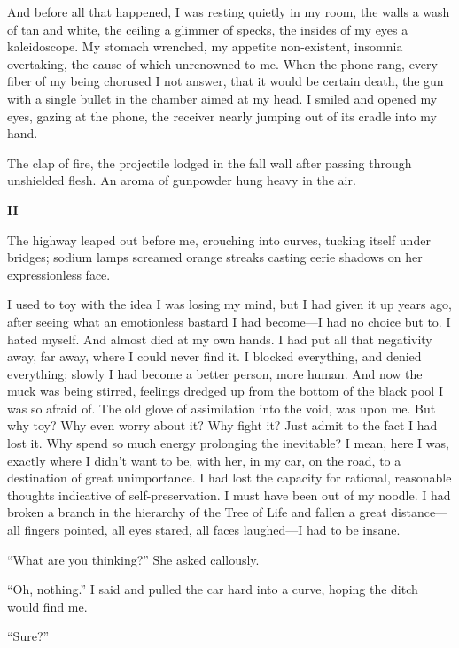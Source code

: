 \documentclass[
]{article}
\begin{document}
And before all that happened, I was resting quietly in my room, the
walls a wash of tan and white, the ceiling a glimmer of specks, the
insides of my eyes a kaleidoscope. My stomach wrenched, my appetite
non-existent, insomnia overtaking, the cause of which unrenowned to me.
When the phone rang, every fiber of my being chorused I not answer, that
it would be certain death, the gun with a single bullet in the chamber
aimed at my head. I smiled and opened my eyes, gazing at the phone, the
receiver nearly jumping out of its cradle into my hand.

The clap of fire, the projectile lodged in the fall wall after passing
through unshielded flesh. An aroma of gunpowder hung heavy in the air.

\textbf{II}

The highway leaped out before me, crouching into curves, tucking itself
under bridges; sodium lamps screamed orange streaks casting eerie
shadows on her expressionless face.

I used to toy with the idea I was losing my mind, but I had given it up
years ago, after seeing what an emotionless bastard I had become---I had
no choice but to. I hated myself. And almost died at my own hands. I had
put all that negativity away, far away, where I could never find it. I
blocked everything, and denied everything; slowly I had become a better
person, more human. And now the muck was being stirred, feelings dredged
up from the bottom of the black pool I was so afraid of. The old glove
of assimilation into the void, was upon me. But why toy? Why even worry
about it? Why fight it? Just admit to the fact I had lost it. Why spend
so much energy prolonging the inevitable? I mean, here I was, exactly
where I didn't want to be, with her, in my car, on the road, to a
destination of great unimportance. I had lost the capacity for rational,
reasonable thoughts indicative of self-preservation. I must have been
out of my noodle. I had broken a branch in the hierarchy of the Tree of
Life and fallen a great distance---all fingers pointed, all eyes stared,
all faces laughed---I had to be insane.

``What are you thinking?'' She asked callously.

``Oh, nothing.'' I said and pulled the car hard into a curve, hoping the
ditch would find me.

``Sure?''
\end{document}
